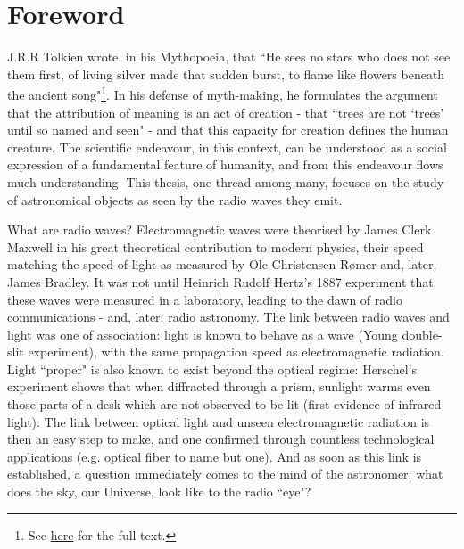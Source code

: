 \chapter*{Foreword}

\pg
J.R.R Tolkien wrote, in his Mythopoeia, that ``He sees no stars who does not see them first, of living silver made that sudden burst, to flame like flowers beneath the ancient song"\footnote{See \href{http://home.agh.edu.pl/~evermind/jrrtolkien/mythopoeia.htm}{here} for the full text.}. In his defense of myth-making, he formulates the argument that the attribution of meaning is an act of creation - that ``trees are not `trees' until so named and seen" - and that this capacity for creation defines the human creature. The scientific endeavour, in this context, can be understood as a social expression of a fundamental feature of humanity, and from this endeavour flows much understanding. This thesis, one thread among many, focuses on the study of astronomical objects as seen by the radio waves they emit.

\pg
What are radio waves? Electromagnetic waves were theorised by James Clerk Maxwell \citep{maxwell} in his great theoretical contribution to modern physics, their speed matching the speed of light as measured by Ole Christensen R\o mer and, later, James Bradley. It was not until Heinrich Rudolf Hertz's 1887 experiment that these waves were measured in a laboratory, leading to the dawn of radio communications - and, later, radio astronomy. The link between radio waves and light was one of association: light is known to behave as a wave (Young double-slit experiment), with the same propagation speed as electromagnetic radiation. Light ``proper" is also known to exist beyond the optical regime: Herschel's experiment shows that when diffracted through a prism, sunlight warms even those parts of a desk which are not observed to be lit (first evidence of infrared light). The link between optical light and unseen electromagnetic radiation is then an easy step to make, and one confirmed through countless technological applications (e.g. optical fiber to name but one). And as soon as this link is established, a question immediately comes to the mind of the astronomer: what does the sky, our Universe, look like to the radio ``eye"?


